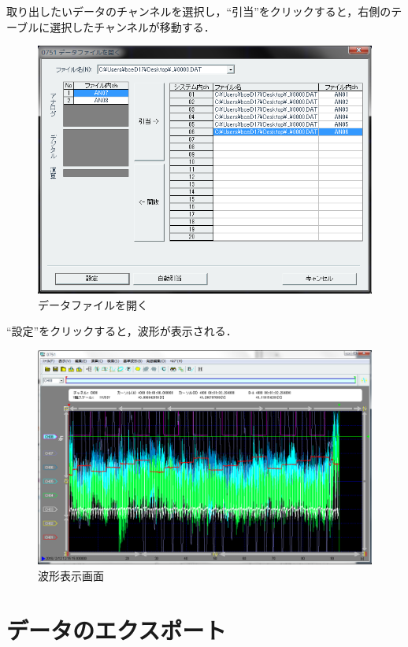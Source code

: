 \documentclass[a4j, twocolumn, openleft, uplatex, dvipdfmx]{jsbook}
\begin{document}
        取り出したいデータのチャンネルを選択し，``引当''をクリックすると，右側のテーブルに選択したチャンネルが移動する．
        \begin{figure}[H]
            \centering
            \includegraphics[width=\linewidth]{./figure/0751-open.png}
            \caption{データファイルを開く}
        \end{figure}
        ``設定''をクリックすると，波形が表示される．
        \begin{figure}[H]
            \centering
            \includegraphics[width=\linewidth]{./figure/0751-wave.png}
            \caption{波形表示画面}
        \end{figure}
        \section{データのエクスポート}
\end{document}
